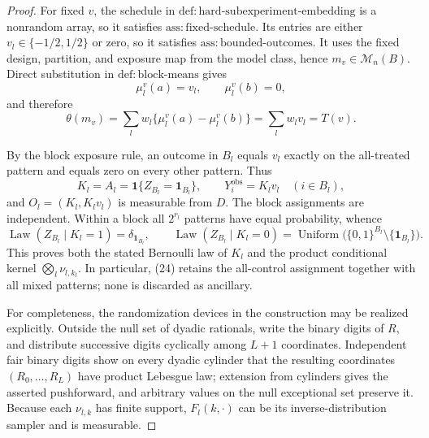 \documentclass{article}
\begin{document}
\begin{proof}
For fixed \(v\), the schedule in
\(\mathrm{def{:}hard\text{-}subexperiment\text{-}embedding}\) is a
nonrandom array, so it satisfies
\(\mathrm{ass{:}fixed\text{-}schedule}\).  Its entries are either
\(v_l\in\{-1/2,1/2\}\) or zero, so it satisfies
\(\mathrm{ass{:}bounded\text{-}outcomes}\).  It uses the fixed design,
partition, and exposure map from the model class, hence \(m_v\in
\mathcal M_n(B)\).  Direct substitution in
\(\mathrm{def{:}block\text{-}means}\) gives
\[
 \mu_l^v(a)=v_l,\qquad \mu_l^v(b)=0,
\]
and therefore
\[
 \theta(m_v)=\sum_lw_l\{\mu_l^v(a)-\mu_l^v(b)\}
 =\sum_lw_lv_l=T(v).
\tag{22}
\]

By the block exposure rule, an outcome in \(B_l\) equals \(v_l\)
exactly on the all-treated pattern and equals zero on every other
pattern.  Thus
\[
 K_l=A_l=\mathbf1\{Z_{B_l}=\mathbf1_{B_l}\},\qquad
 Y_i^{\mathrm{obs}}=K_lv_l\quad(i\in B_l),
\tag{23}
\]
and \(O_l=(K_l,K_lv_l)\) is measurable from \(D\).  The block
assignments are independent.  Within a block all \(2^{r_l}\) patterns
have equal probability, whence
\[
 \operatorname{Law}(Z_{B_l}\mid K_l=1)
 =\delta_{\mathbf1_{B_l}},\qquad
 \operatorname{Law}(Z_{B_l}\mid K_l=0)
 =\operatorname{Uniform}
 \bigl(\{0,1\}^{B_l}\setminus\{\mathbf1_{B_l}\}\bigr).
\tag{24}
\]
This proves both the stated Bernoulli law of \(K_l\) and the product
conditional kernel \(\bigotimes_l\nu_{l,k_l}\).  In particular, (24)
retains the all-control assignment together with all mixed patterns;
none is discarded as ancillary.

For completeness, the randomization devices in the construction may
be realized explicitly.  Outside the null set of dyadic rationals,
write the binary digits of \(R\), and distribute successive digits
cyclically among \(L+1\) coordinates.  Independent fair binary digits
show on every dyadic cylinder that the resulting coordinates
\((R_0,\ldots,R_L)\) have product Lebesgue law; extension from
cylinders gives the asserted pushforward, and arbitrary values on the
null exceptional set preserve it.  Because each \(\nu_{l,k}\) has
finite support, \(F_l(k,\cdot)\) can be its inverse-distribution
sampler and is measurable.


\end{proof}
\end{document}
